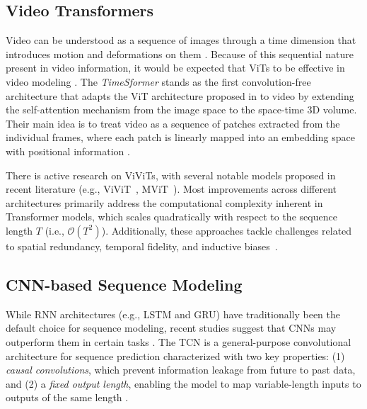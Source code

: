 \documentclass[runningheads]{llncs}
\begin{document}
\subsection{Video Transformers}
\label{sec:video-transformers}
Video can be understood as a sequence of images through a time
dimension that introduces motion and deformations on them
\cite{Selva_2023}. Because of this sequential nature present in video
information, it would be expected that \ac{ViTs} to be effective in
video modeling \cite{Bertasius2021}. The \textit{TimeSformer} stands
as the first convolution-free architecture that adapts the \ac{ViT}
architecture proposed in \cite{dosovitskiy2020image} to video by
extending the self-attention mechanism from the image space to the
space-time 3D volume\cite{Bertasius2021}. Their main idea is to treat
video as a sequence of patches extracted from the individual frames,
where each patch is linearly mapped into an embedding space with
positional information \cite{Bertasius2021}.

There is active research on \ac{ViViTs}, with several notable
models proposed in recent literature (e.g., ViViT~\cite{Arnab2021},
MViT~\cite{Fan2021}). Most improvements across different architectures
primarily address the computational complexity inherent in Transformer
models, which scales quadratically with respect to the sequence length
$T$ (i.e., $\mathcal{O}(T^2)$). Additionally, these approaches tackle
challenges related to spatial redundancy, temporal fidelity, and
inductive biases~\cite{Selva_2023}.


\subsection{CNN-based Sequence Modeling}
\label{sec:sequence-modeling}
While \ac{RNN} architectures (e.g., LSTM and GRU) have traditionally
been the default choice for sequence modeling, recent studies suggest
that \ac{CNNs} may outperform them in certain tasks
\cite{Bai2018}. The \ac{TCN} is a general-purpose convolutional
architecture for sequence prediction characterized with two key
properties: (1) \emph{causal convolutions}, which prevent information
leakage from future to past data, and (2) a \emph{fixed output
  length}, enabling the model to map variable-length inputs to outputs
of the same length \cite{Bai2018}.
\end{document}
